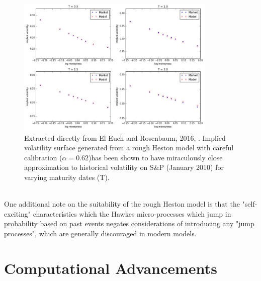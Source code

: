\documentclass[12pt,oneside]{article}
\begin{document}
\begin{figure}[htpb]
    \centering
    \includegraphics[width=0.85\textwidth ]{figs/elEuch_1.jpg}
    \caption{Extracted directly from El Euch and Rosenbaum, 2016, \cite[Figure~5.1]{omar2016microstructural}. Implied volatility surface generated from a rough Heston model with careful calibration ($\alpha=0.62$)has been shown to have miraculously close approximation to historical volatility on S\&P (January 2010) for varying maturity dates (T).}
    \label{fig:elEuch_1}
\end{figure}
\\

One additional note on the suitability of the rough Heston model is that the  "self-exciting" characteristics which the Hawkes micro-processes which jump in probability based on past events negates considerations of introducing any "jump processes", which are generally discouraged in modern models. 
\\

\section{Computational Advancements}
\label{sec:comp_advancement}
\end{document}
